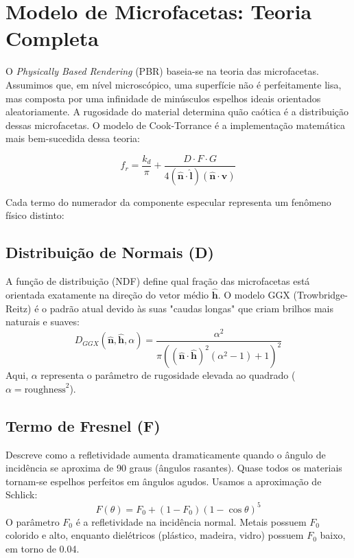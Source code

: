 \section{Modelo de Microfacetas: Teoria Completa}

O \textit{Physically Based Rendering} (PBR) baseia-se na teoria das microfacetas. Assumimos que, em nível microscópico, uma superfície não é perfeitamente lisa, mas composta por uma infinidade de minúsculos espelhos ideais orientados aleatoriamente. A rugosidade do material determina quão caótica é a distribuição dessas microfacetas. O modelo de Cook-Torrance \cite{cook1982reflectance} é a implementação matemática mais bem-sucedida dessa teoria:

\begin{equation}
    f_r = \frac{k_d}{\pi} + \frac{D \cdot F \cdot G}{4(\hat{\mathbf{n}}\cdot\hat{\mathbf{l}})(\hat{\mathbf{n}}\cdot\hat{\mathbf{v}})}
\end{equation}

Cada termo do numerador da componente especular representa um fenômeno físico distinto:

\subsection{Distribuição de Normais (D)}
A função de distribuição (NDF) define qual fração das microfacetas está orientada exatamente na direção do vetor médio $\hat{\mathbf{h}}$. O modelo GGX (Trowbridge-Reitz) é o padrão atual devido às suas "caudas longas" que criam brilhos mais naturais e suaves:
\begin{equation}
    D_{GGX}(\hat{\mathbf{n}}, \hat{\mathbf{h}}, \alpha) = \frac{\alpha^2}{\pi((\hat{\mathbf{n}}\cdot\hat{\mathbf{h}})^2(\alpha^2-1)+1)^2}
\end{equation}
Aqui, $\alpha$ representa o parâmetro de rugosidade elevada ao quadrado ($\alpha = \text{roughness}^2$).

\subsection{Termo de Fresnel (F)}
Descreve como a refletividade aumenta dramaticamente quando o ângulo de incidência se aproxima de 90 graus (ângulos rasantes). Quase todos os materiais tornam-se espelhos perfeitos em ângulos agudos. Usamos a aproximação de Schlick:
\begin{equation}
    F(\theta) = F_0 + (1-F_0)(1-\cos\theta)^5
\end{equation}
O parâmetro $F_0$ é a refletividade na incidência normal. Metais possuem $F_0$ colorido e alto, enquanto dielétricos (plástico, madeira, vidro) possuem $F_0$ baixo, em torno de 0.04.

